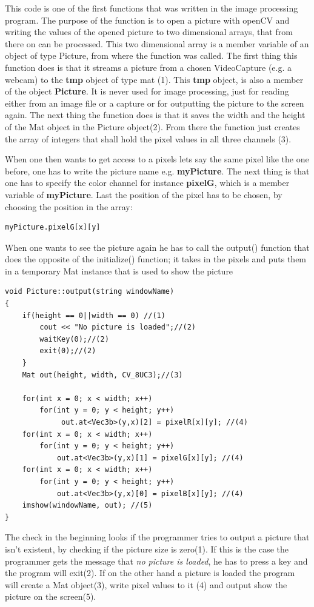 This code is one of the first functions that was written in the image processing program. The purpose of the function is to open a picture with openCV and writing the values of the opened picture to two dimensional arrays, that from there on can be processed. This two dimensional array is a member variable of an object of type Picture, from where the function was called. 
The first thing this function does is that it streams a picture from a chosen VideoCapture (e.g. a webcam) to the \textbf{tmp} object of type mat (1). This \textbf{tmp} object, is also a member of the object \textbf{Picture}. It is never used for image processing, just for reading either from an image file or a capture or for outputting the picture to the screen again. The next thing the function does is that it saves the width and the height of the Mat object in the Picture object(2). From there the function just creates the array of integers that shall hold the pixel values in all three channels (3). 

When one then wants to get access to a pixels lets say the same pixel like the one before, one has to write the picture name e.g. \textbf{myPicture}. The next thing is that one has to specify the color channel for instance \textbf{pixelG}, which is a member variable of \textbf{myPicture}. Last the position of the pixel has to be chosen, by choosing the position in the array:

\begin{lstlisting}
myPicture.pixelG[x][y]
\end{lstlisting}

When one wants to see the picture again he has to call the output() function that does the opposite of the initialize() function; it takes in the pixels and puts them in a temporary Mat instance that is used to show the picture

\begin{lstlisting}
void Picture::output(string windowName)
{
	if(height == 0||width == 0) //(1)
		cout << "No picture is loaded";//(2)
		waitKey(0);//(2)
		exit(0);//(2)
	}
	Mat out(height, width, CV_8UC3);//(3)

	for(int x = 0; x < width; x++)
		for(int y = 0; y < height; y++)
			 out.at<Vec3b>(y,x)[2] = pixelR[x][y]; //(4)
	for(int x = 0; x < width; x++)
		for(int y = 0; y < height; y++)
			out.at<Vec3b>(y,x)[1] = pixelG[x][y]; //(4)
	for(int x = 0; x < width; x++)
		for(int y = 0; y < height; y++)
			out.at<Vec3b>(y,x)[0] = pixelB[x][y]; //(4)		
	imshow(windowName, out); //(5)
}
\end{lstlisting}
The check in the beginning looks if the programmer tries to output a picture that isn't existent, by checking if the picture size is zero(1). If this is the case the programmer gets the message that \textit{no picture is loaded}, he has to press a key and the program will exit(2). If on the other hand a picture is loaded the program will create a Mat object(3), write pixel values to it (4) and output show the picture on the screen(5). 

